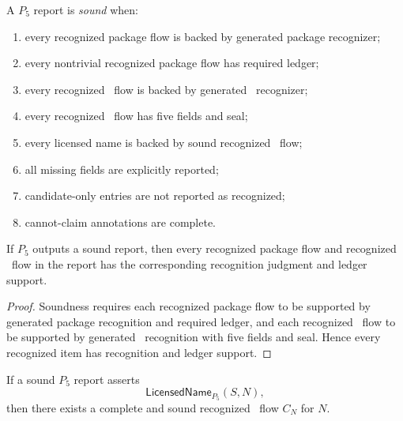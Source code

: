 \begin{definition}
\label{def:pkg-namecert-sound-p5-report}
A $P_5$ report is \emph{sound} when:
\begin{enumerate}
\item every recognized package flow is backed by generated package recognizer;
\item every nontrivial recognized package flow has required ledger;
\item every recognized \NameCert\ flow is backed by generated \NameCert\ recognizer;
\item every recognized \NameCert\ flow has five fields and seal;
\item every licensed name is backed by sound recognized \NameCert\ flow;
\item all missing fields are explicitly reported;
\item candidate-only entries are not reported as recognized;
\item cannot-claim annotations are complete.
\end{enumerate}
\end{definition}

\begin{theorem}
\label{thm:pkg-namecert-sound-p5-report}
If $P_5$ outputs a sound report, then every recognized package flow and recognized \NameCert\ flow in the report has the corresponding recognition judgment and ledger support.
\end{theorem}

\begin{proof}
Soundness requires each recognized package flow to be supported by generated package recognition and required ledger, and each recognized \NameCert\ flow to be supported by generated \NameCert\ recognition with five fields and seal. Hence every recognized item has recognition and ledger support.
\end{proof}

\begin{theorem}
\label{thm:pkg-namecert-sound-licensed-name}
If a sound $P_5$ report asserts
$$
  \mathsf{LicensedName}_{P_5}(S,N),
$$
then there exists a complete and sound recognized \NameCert\ flow $C_N$ for $N$.
\end{theorem}

